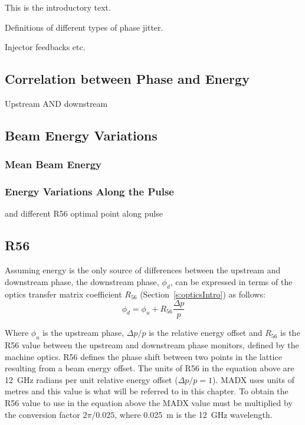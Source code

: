 
This is the introductory text.


Definitions of different types of phase jitter.



Injector feedbacks etc.


\subsection{Correlation between Phase and Energy}
\label{ss:corrPhaseEnergy}

Upstream AND downstream

\subsection{Beam Energy Variations}
\label{ss:energyVariations}

\subsubsection{Mean Beam Energy}

\subsubsection{Energy Variations Along the Pulse}

and different R56 optimal point along pulse


\subsection{R56}
\label{ss:r56Equations}

Assuming energy is the only source of differences between the upstream and downstream phase, the downstream phase, \(\phi_d\), can be expressed in terms of the optics transfer matrix coefficient \(R_{56}\) (Section~\ref{s:opticsIntro}) as follows:
\begin{equation}
\phi_d = \phi_u + R_{56}\frac{\Delta p}{p}
\label{e:r56PhasEq}
\end{equation}

Where \(\phi_u\) is the upstream phase, \(\Delta p / p\) is the relative energy offset and \(R_{56}\) is the R56 value between the upstream and downstream phase monitors, defined by the machine optics. R56 defines the phase shift between two points in the lattice resulting from a beam energy offset. The units of R56 in the equation above are 12~GHz radians per unit relative energy offset (\(\Delta p/p = 1\)). MADX uses units of metres and this value is what will be referred to in this chapter. To obtain the R56 value to use in the equation above the MADX value must be multiplied by the conversion factor \(2\pi/0.025\), where 0.025~m is the 12~GHz wavelength.

